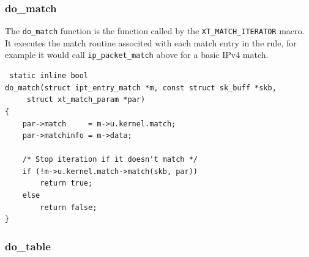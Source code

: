 \documentclass[a4paper,10pt]{article}
\newcommand{\code}[1]{\texttt{#1}}
\begin{document}
\subsubsection{do\_match}
The \code{do\_match} function is the function called by the
\code{XT\_MATCH\_ITERATOR} macro. It executes the match routine
associted with each match entry in the rule, for example it would call
\code{ip\_packet\_match} above for a basic IPv4 match.

\lstset{stepnumber=0}
\begin{lstlisting}
 static inline bool
do_match(struct ipt_entry_match *m, const struct sk_buff *skb,
	 struct xt_match_param *par)
{
	par->match     = m->u.kernel.match;
	par->matchinfo = m->data;

	/* Stop iteration if it doesn't match */
	if (!m->u.kernel.match->match(skb, par))
		return true;
	else
		return false;
}
\end{lstlisting}

\subsubsection{do\_table}
\end{document}
